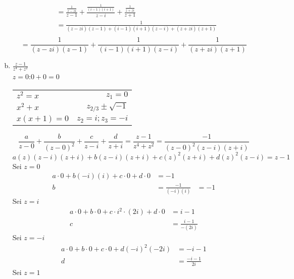 \documentclass[11pt,a4paper]{article}
\begin{document}
\begin{enumerate}[a)]
\begin{align*}
        &=\frac{\frac{1}{z-zi}}{z-1}+\frac{\frac{1}{\left(i-1\right)\left(i+1\right)}}{z-i}+\frac{\frac{1}{z+zi}}{z+1}
        \\&=\frac{1}{(z-zi)(z-1)+(i-1)(i+1)(z-i)+(z+zi)(z+1)}\\
    \end{align*}
    \begin{equation*}
        =\frac{1}{\left(z-zi\right)\left(z-1\right)}+\frac{1}{\left(i-1\right)\left(i+1\right)\left(z-i\right)}+\frac{1}{\left(z+zi\right)\left(z+1\right)}
    \end{equation*}
      \item $\frac{z-1}{z^4+z^2}$\\
      $z=0$:$0+0=0$\\
      \begin{tabular}{lr}
        $z^2=x$&$z_1=0$\\
        $x^2+x$&$z_{2/3}\pm\sqrt{-1}$\\
        $x\left(x+1\right)=0$ & $z_2=i;z_3=-i$
      \end{tabular}
      \begin{equation*}
        \frac{a}{z-0}+\frac{b}{\left(z-0\right)^2}+\frac{c}{z-i}+\frac{d}{z+i} = \frac{z-1}{z^4+z^2} = \frac{-1}{\left(z-0\right)^2\left(z-i\right)\left(z+i\right)}
      \end{equation*}
      \begin{equation*}
        a\left(z\right)\left(z-i\right)\left(z+i\right)+b\left(z-i\right)\left(z+i\right)+c\left(z\right)^2\left(z+i\right)+d\left(z\right)^2\left(z-i\right)=z-1
      \end{equation*}
      Sei $z=0$
      \begin{align*}
        a\cdot 0+b\left(-i\right)\left(i\right)+c\cdot 0+ d\cdot 0 &= -1\\
        b&=\frac{-1}{\left(-i\right)\left(i\right)}&=-1
      \end{align*}
      Sei $z=i$
      \begin{align*}
        a\cdot 0+b\cdot 0+c\cdot i^2 \cdot \left(2i\right)+d\cdot 0&=i-1\\
        c&=\frac{i-1}{-\left(2i\right)}
      \end{align*}
      Sei $z=-i$
      \begin{align*}
        a\cdot 0+b\cdot 0+c\cdot 0+d\left(-i\right)^2\left(-2i\right)&=-i-1\\
        d&=\frac{-i-1}{2i}
      \end{align*}
      Sei $z=1$
      \begin{align*}

\end{align*}
\end{enumerate}
\end{document}
